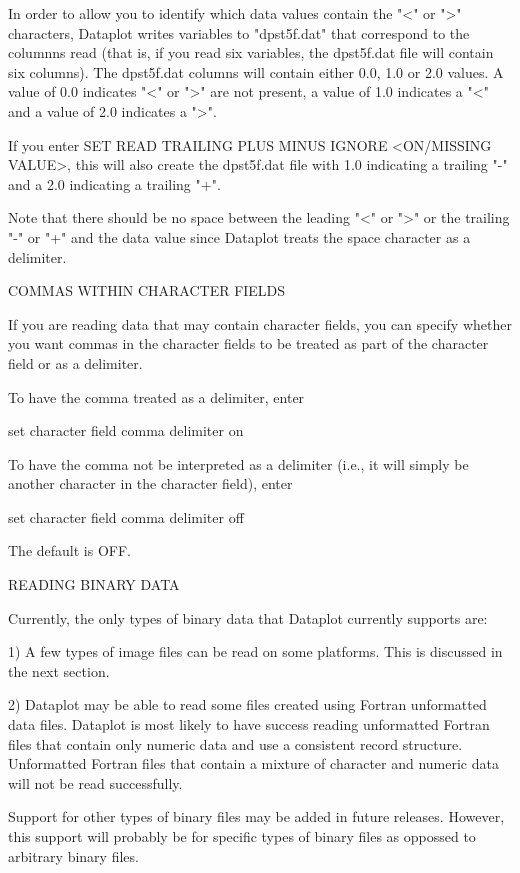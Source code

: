 In order to allow you to identify which data values contain the "<" or ">"
characters, Dataplot writes variables to "dpst5f.dat" that correspond to the
columnns read (that is, if you read six variables, the dpst5f.dat file will
contain six columns).  The dpst5f.dat columns will contain either 0.0, 1.0
or 2.0 values.  A value of 0.0 indicates "<" or ">" are not present, a value
of 1.0 indicates a "<" and a value of 2.0 indicates a ">".

If you enter SET READ TRAILING PLUS MINUS IGNORE <ON/MISSING VALUE>, this
will also create the dpst5f.dat file with 1.0 indicating a trailing "-"
and a 2.0 indicating a trailing "+".

Note that there should be no space between the leading "<" or ">"  or
the trailing "-" or "+" and the data value since Dataplot treats the
space character as a delimiter.


COMMAS WITHIN CHARACTER FIELDS

If you are reading data that may contain character fields, you can
specify whether you want commas in the character fields to be
treated as part of the character field or as a delimiter.

To have the comma treated as a delimiter, enter

    set character field comma delimiter on

To have the comma not be interpreted as a delimiter (i.e., it
will simply be another character in the character field), enter
 
    set character field comma delimiter off

The default is OFF.

READING BINARY DATA

Currently, the only types of binary data that Dataplot currently
supports are:

  1) A few types of image files can be read on some platforms.
     This is discussed in the next section.

  2) Dataplot may be able to read some files created using Fortran
     unformatted data files.  Dataplot is most likely to have success
     reading unformatted Fortran files that contain only numeric data
     and use a consistent record structure.  Unformatted Fortran
     files that contain a mixture of character and numeric data
     will not be read successfully.

Support for other types of binary files may be added in future
releases.  However, this support will probably be for specific
types of binary files as oppossed to arbitrary binary files.

